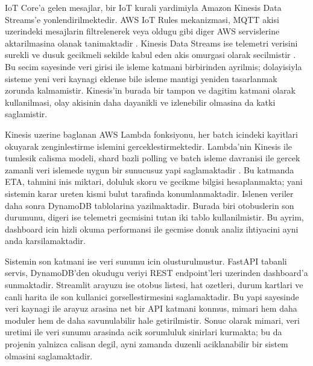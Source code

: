 IoT Core'a gelen mesajlar, bir IoT kurali yardimiyla Amazon Kinesis Data Streams'e yonlendirilmektedir. AWS IoT Rules mekanizmasi, MQTT akisi uzerindeki mesajlarin filtrelenerek veya oldugu gibi diger AWS servislerine aktarilmasina olanak tanimaktadir \cite{aws_iot_rules}. Kinesis Data Streams ise telemetri verisini surekli ve dusuk gecikmeli sekilde kabul eden akis omurgasi olarak secilmistir \cite{kinesis_intro}. Bu secim sayesinde veri girisi ile isleme katmani birbirinden ayrilmis; dolayisiyla sisteme yeni veri kaynagi eklense bile isleme mantigi yeniden tasarlanmak zorunda kalmamistir. Kinesis'in burada bir tampon ve dagitim katmani olarak kullanilmasi, olay akisinin daha dayanikli ve izlenebilir olmasina da katki saglamistir.

Kinesis uzerine baglanan AWS Lambda fonksiyonu, her batch icindeki kayitlari okuyarak zenginlestirme islemini gerceklestirmektedir. Lambda'nin Kinesis ile tumlesik calisma modeli, shard bazli polling ve batch isleme davranisi ile gercek zamanli veri islemede uygun bir sunucusuz yapi saglamaktadir \cite{lambda_kinesis}. Bu katmanda ETA, tahmini inis miktari, doluluk skoru ve gecikme bilgisi hesaplanmakta; yani sistemin karar ureten kismi bulut tarafinda konumlanmaktadir. Islenen veriler daha sonra DynamoDB tablolarina yazilmaktadir. Burada biri otobuslerin son durumunu, digeri ise telemetri gecmisini tutan iki tablo kullanilmistir. Bu ayrim, dashboard icin hizli okuma performansi ile gecmise donuk analiz ihtiyacini ayni anda karsilamaktadir.

Sistemin son katmani ise veri sunumu icin olusturulmustur. FastAPI tabanli servis, DynamoDB'den okudugu veriyi REST endpoint'leri uzerinden dashboard'a sunmaktadir. Streamlit arayuzu ise otobus listesi, hat ozetleri, durum kartlari ve canli harita ile son kullanici gorsellestirmesini saglamaktadir. Bu yapi sayesinde veri kaynagi ile arayuz arasina net bir API katmani konmus, mimari hem daha moduler hem de daha savunulabilir hale getirilmistir. Sonuc olarak mimari, veri uretimi ile veri sunumu arasinda acik sorumluluk sinirlari kurmakta; bu da projenin yalnizca calisan degil, ayni zamanda duzenli aciklanabilir bir sistem olmasini saglamaktadir.
